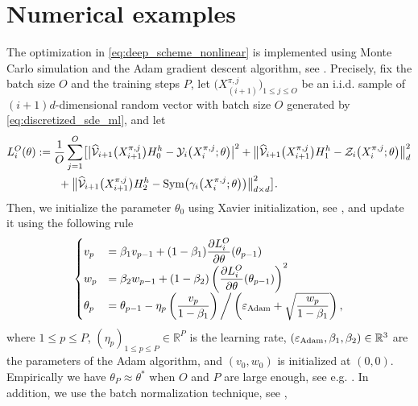 \documentclass[12pt]{article}
\numberwithin{equation}{section}
\newcommand{\real}{\mathbb{R}}
\let\oldcitet=\citet
\renewcommand{\cite}[1]{\textcolor[rgb]{0,0,1}{\oldcitet{#1}}}
\renewcommand{\citet}[1]{\textcolor[rgb]{0,0,1}{\oldcitet{#1}}}
\begin{document}
\section{Numerical examples}
\label{sec:numerical}
The optimization in
\eqref{eq:deep_scheme_nonlinear}
is implemented using Monte Carlo simulation
and the Adam gradient descent algorithm,
see \cite{kingma2014adam}.
Precisely, fix the batch size $O$ and the training steps $P$,
let $\big(X^{\pi,j}_{(i+1)}\big)_{1 \leq j \leq O}$
be an i.i.d. sample of $(i+1)d$-dimensional random vector
with batch size $O$ generated by \eqref{eq:discretized_sde_ml}, and let
\begin{align*}
    L^O_i(\theta) &:= \frac{1}{O}\sum\limits_{j=1}^O \bigl[ \big\lvert \widehat{\cal V}_{i+1}\big(X^{\pi,j}_{i+1}\big) H_0^h - {\cal Y}_i\big(X^{\pi,j}_i;\theta\big)\big\rvert^2
        + \big\lVert \widehat{\cal V}_{i+1}\big(X^{\pi,j}_{i+1}\big)H_1^h - {\cal Z}_i\big(X^{\pi,j}_{i};\theta\big)\big\rVert_d^2
                  \\
                  & \qquad + \big\lVert \widehat{\cal V}_{i+1}\big(X^{\pi,j}_{i+1}\big)H_2^h
              - {\rm Sym} \big( {\cal \gamma}_i\big(X^{\pi,j}_i ;\theta\big)\big) \big\rVert_{d\times d}^2\bigr].
\end{align*}
Then, we initialize the parameter $\theta_0$
using Xavier initialization, see \cite{glorot2010understanding},
and update it using the following rule
\begin{align*}
  \begin{cases}
    \displaystyle
    v_p         &
    \displaystyle
    = \beta_1 v_{p-1} + (1-\beta_1)
  \frac{\partial L^O_i}{\partial \theta} (\theta_{p-1}) \\
\displaystyle
w_p         &
\displaystyle
    = \beta_2 w_{p-1} + (1-\beta_2) \left(
  \frac{\partial L^O_i}{\partial \theta} (\theta_{p-1})\right)^2 \\
\displaystyle
\theta_p    &
\displaystyle
    = \theta_{p-1} - \eta_p \left( \frac{v_p}{1-\beta_1} \right)
    \bigg/ \left( \varepsilon_{\rm Adam} + \sqrt{\frac{w_p}{1-\beta_1}} \right),
  \end{cases}
\end{align*}
where $1 \leq p \leq P$, $(\eta_p)_{1 \leq p \leq P} \in \real^P$ is the learning rate,
$(\varepsilon_{\rm Adam},\beta_1,\beta_2) \in \real^3$ are the parameters
 of the Adam algorithm,
and $(v_0, w_0)$ is initialized at $(0,0)$.
Empirically we have $\theta_P \approx \theta^*$
when $O$ and $P$ are large enough, see e.g. \cite{kingma2014adam}.
    In addition, we use the batch normalization technique, see \cite{ioffe2015batch},
\end{document}
